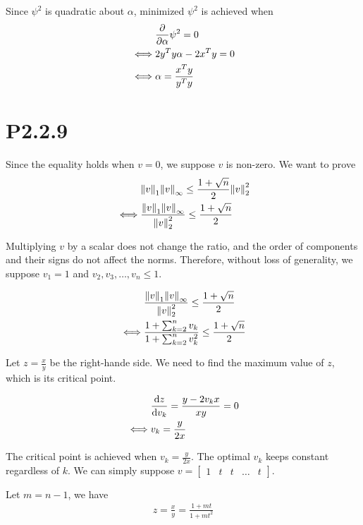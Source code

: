 \documentclass{article}
\begin{document}
Since $\psi^2$ is quadratic about $\alpha$, minimized $\psi^2$ is achieved when
\begin{align*}
         & \pdv{\alpha}\psi^2 = 0   \\
    \iff & 2y^Ty\alpha-2x^Ty=0      \\
    \iff & \alpha=\frac{x^Ty}{y^Ty}
\end{align*}

\section*{P2.2.9}
Since the equality holds when $v=0$, we suppose $v$ is non-zero. We want to prove
\begin{align*}
         & {\norm{v}_1\norm{v}_\infty}
    \le \frac{1+\sqrt{n}}{2}\norm{v}_2^2                  \\
    \iff & \frac{\norm{v}_1\norm{v}_\infty}{\norm{v}_2^2}
    \le \frac{1+\sqrt{n}}{2}
\end{align*}

Multiplying $v$ by a scalar does not change the ratio, and
the order of components and their signs do not affect the norms.
Therefore, without loss of generality, we suppose $v_1=1$ and $v_2,v_3,\dots,v_n \le 1$.

\begin{align*}
         & \frac{\norm{v}_1\norm{v}_\infty}{\norm{v}_2^2}
    \le \frac{1+\sqrt{n}}{2}                                                        \\
    \iff & \frac{1+\sum_{k=2}^n v_k}{1+\sum_{k=2}^n v_k^2} \le \frac{1+\sqrt{n}}{2}
\end{align*}

Let $z=\frac{x}{y}$ be the right-hande side. We need to find the maximum value of $z$, which is its critical point.

\begin{align*}
         & \dv{z}{v_k}  =\frac{y-2v_kx}{xy} = 0 \\
    \iff & v_k =\frac{y}{2x}
\end{align*}

The critical point is achieved when $v_k=\frac{y}{2x}$.
The optimal $v_k$ keeps constant regardless of $k$.
We can simply suppose $v=\begin{bmatrix}
        1 & t & t & \dots & t
    \end{bmatrix}$.

Let $m=n-1$, we have
\begin{align*}
    z = \frac{x}{y} =\frac{1+mt}{1+mt^2}
\end{align*}
\end{document}
